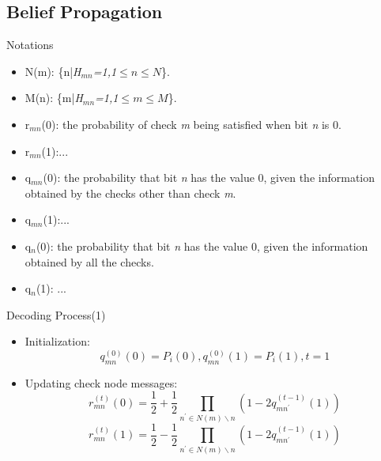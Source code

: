\documentclass{beamer}
\newcommand{\xieti}{\textsl}
\begin{document}
\subsection{Belief Propagation}
\begin{frame}
    \begin{block}{Notations}
        \begin{itemize}
        \item N(m): \{n|\xieti{H$_{mn}$=1,1$\leq n\leq N$}\}.
        \item M(n): \{m|\xieti{H$_{mn}$=1,1$\leq m\leq M$}\}.
        \item r$_{mn}$(0): the probability of check \xieti{m} being satisfied when bit \xieti{n} is 0.
        \item r$_{mn}$(1):\quad...
        \item q$_{mn}$(0): the probability that bit \xieti{n} has the value 0, given the information obtained by the checks other than check \xieti{m}.
        \item q$_{mn}$(1):\quad...
        \item q$_{n}$(0): the probability that bit \xieti{n} has the value 0, given the information obtained by all the checks.
        \item q$_{n}$(1): \quad...
        \end{itemize}
    \end{block}
\end{frame}
\begin{frame}
    \begin{block}{Decoding Process(1)}
        \begin{itemize}
        \item Initialization: \begin{equation*}q_{mn}^{(0)}(0)=P_i(0), q_{mn}^{(0)}(1)=P_i(1), t=1\end{equation*}
        \item Updating check node messages: \begin{equation*}
                                            r_{mn}^{(t)}(0)=\frac{1}{2}+\frac{1}{2}\prod_{n^\prime\in N(m)\backslash n}
                                            (1-2q_{mn^\prime}^{(t-1)}(1))
                                            \end{equation*}
                                            \begin{equation*}
                                            r_{mn}^{(t)}(1)=\frac{1}{2}-\frac{1}{2}\prod_{n^\prime\in N(m)\backslash n}
                                            (1-2q_{mn^\prime}^{(t-1)}(1))
                                            \end{equation*}
        \end{itemize}
    \end{block}
\end{frame}
\end{document}
